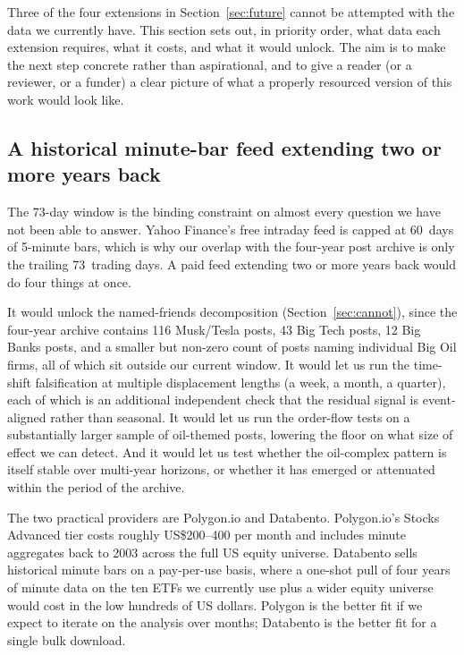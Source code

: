 \documentclass[11pt,a4paper]{article}
\begin{document}
Three of the four extensions in Section~\ref{sec:future} cannot be attempted with the data we currently have. This section sets out, in priority order, what data each extension requires, what it costs, and what it would unlock. The aim is to make the next step concrete rather than aspirational, and to give a reader (or a reviewer, or a funder) a clear picture of what a properly resourced version of this work would look like.

\subsection{A historical minute-bar feed extending two or more years back}

The 73-day window is the binding constraint on almost every question we have not been able to answer. Yahoo Finance's free intraday feed is capped at 60~days of 5-minute bars, which is why our overlap with the four-year post archive is only the trailing 73~trading days. A paid feed extending two or more years back would do four things at once.

It would unlock the named-friends decomposition (Section~\ref{sec:cannot}), since the four-year archive contains 116 Musk/Tesla posts, 43 Big Tech posts, 12 Big Banks posts, and a smaller but non-zero count of posts naming individual Big Oil firms, all of which sit outside our current window. It would let us run the time-shift falsification at multiple displacement lengths (a week, a month, a quarter), each of which is an additional independent check that the residual signal is event-aligned rather than seasonal. It would let us run the order-flow tests on a substantially larger sample of oil-themed posts, lowering the floor on what size of effect we can detect. And it would let us test whether the oil-complex pattern is itself stable over multi-year horizons, or whether it has emerged or attenuated within the period of the archive.

The two practical providers are Polygon.io and Databento. Polygon.io's Stocks Advanced tier costs roughly US\$200--400 per month and includes minute aggregates back to 2003 across the full US equity universe. Databento sells historical minute bars on a pay-per-use basis, where a one-shot pull of four years of minute data on the ten ETFs we currently use plus a wider equity universe would cost in the low hundreds of US dollars. Polygon is the better fit if we expect to iterate on the analysis over months; Databento is the better fit for a single bulk download.
\end{document}
